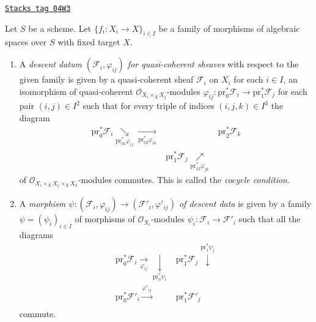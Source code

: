 \begin{definition}
\label{spaces-descent-definition-descent-datum-quasi-coherent}
\href{https://stacks.math.columbia.edu/tag/04W3}{\texttt{Stacks tag 04W3}}

Let $S$ be a scheme. Let $\{f_i : X_i \to X\}_{i \in I}$ be a family
of morphisms of algebraic spaces over $S$ with fixed target $X$.
\begin{enumerate}
\item A {\it descent datum $(\mathcal{F}_i, \varphi_{ij})$
for quasi-coherent sheaves} with respect to the given family
is given by a quasi-coherent sheaf $\mathcal{F}_i$ on $X_i$ for
each $i \in I$, an isomorphism of quasi-coherent
$\mathcal{O}_{X_i \times_X X_j}$-modules
$\varphi_{ij} : \text{pr}_0^*\mathcal{F}_i \to \text{pr}_1^*\mathcal{F}_j$
for each pair $(i, j) \in I^2$
such that for every triple of indices $(i, j, k) \in I^3$ the
diagram
$$
\begin{array}{ccc}\text{pr}_0^*\mathcal{F}_i \underset{\text{pr}_{01}^*\varphi_{ij}}{\searrow}\underset{\text{pr}_{02}^*\varphi_{ik}}{\longrightarrow} &  & \text{pr}_2^*\mathcal{F}_k \\  & \text{pr}_1^*\mathcal{F}_j \underset{\text{pr}_{12}^*\varphi_{jk}}{\nearrow} & \end{array}
$$
of $\mathcal{O}_{X_i \times_X X_j \times_X X_k}$-modules
commutes. This is called the {\it cocycle condition}.
\item A {\it morphism $\psi : (\mathcal{F}_i, \varphi_{ij}) \to
(\mathcal{F}'_i, \varphi'_{ij})$ of descent data} is given
by a family $\psi = (\psi_i)_{i\in I}$ of morphisms of
$\mathcal{O}_{X_i}$-modules $\psi_i : \mathcal{F}_i \to \mathcal{F}'_i$
such that all the diagrams
$$
\begin{array}{cc}\text{pr}_0^*\mathcal{F}_i \underset{\varphi_{ij}}{\longrightarrow}\underset{\text{pr}_0^*\psi_i}{\downarrow} & \text{pr}_1^*\mathcal{F}_j \overset{\text{pr}_1^*\psi_j}{\downarrow} \\ \text{pr}_0^*\mathcal{F}'_i \overset{\varphi'_{ij}}{\longrightarrow} & \text{pr}_1^*\mathcal{F}'_j \\  & \end{array}
$$
commute.
\end{enumerate}
\end{definition}

